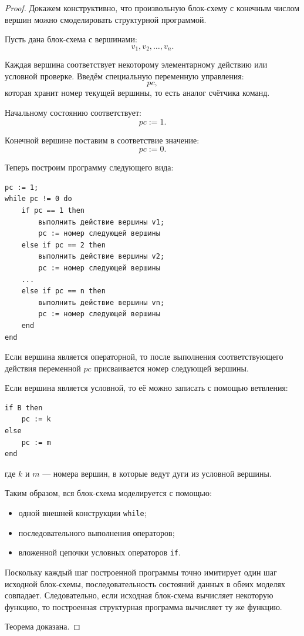 \documentclass[12pt,a4paper]{article}
\begin{document}
\begin{proof}
Докажем конструктивно, что произвольную блок-схему с конечным числом вершин можно смоделировать структурной программой.

Пусть дана блок-схема с вершинами:
\[
    v_1, v_2, \ldots, v_n.
\]

Каждая вершина соответствует некоторому элементарному действию или условной проверке.
Введём специальную переменную управления:
\[
    pc,
\]
которая хранит номер текущей вершины, то есть аналог счётчика команд.

Начальному состоянию соответствует:
\[
    pc := 1.
\]

Конечной вершине поставим в соответствие значение:
\[
    pc := 0.
\]

Теперь построим программу следующего вида:

\begin{lstlisting}[style=pseudo]
pc := 1;
while pc != 0 do
    if pc == 1 then
        выполнить действие вершины v1;
        pc := номер следующей вершины
    else if pc == 2 then
        выполнить действие вершины v2;
        pc := номер следующей вершины
    ...
    else if pc == n then
        выполнить действие вершины vn;
        pc := номер следующей вершины
    end
end
\end{lstlisting}

Если вершина является операторной, то после выполнения соответствующего действия переменной $pc$ присваивается номер следующей вершины.

Если вершина является условной, то её можно записать с помощью ветвления:

\begin{lstlisting}[style=pseudo]
if B then
    pc := k
else
    pc := m
end
\end{lstlisting}

где $k$ и $m$ --- номера вершин, в которые ведут дуги из условной вершины.

Таким образом, вся блок-схема моделируется с помощью:
\begin{itemize}
    \item одной внешней конструкции \texttt{while};
    \item последовательного выполнения операторов;
    \item вложенной цепочки условных операторов \texttt{if}.
\end{itemize}

Поскольку каждый шаг построенной программы точно имитирует один шаг исходной блок-схемы, последовательность состояний данных в обеих моделях совпадает.
Следовательно, если исходная блок-схема вычисляет некоторую функцию, то построенная структурная программа вычисляет ту же функцию.

Теорема доказана.
\end{proof}
\end{document}
